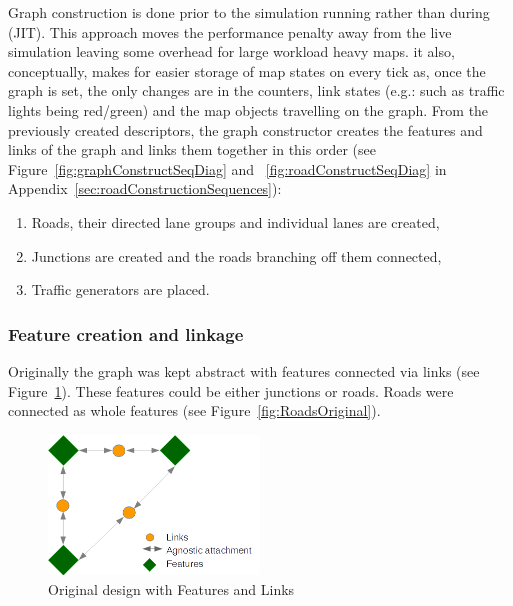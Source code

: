 Graph construction is done prior to the simulation running rather than during (JIT). This approach moves the performance penalty away from the live simulation leaving some overhead for large workload heavy maps. it also, conceptually, makes for easier storage of map states on every tick as, once the graph is set, the only changes are in the counters, link states (e.g.: such as traffic lights being red/green) and the map objects travelling on the graph.
From the previously created descriptors, the graph constructor creates the features and links of the graph and links them together in this order (see Figure~\ref{fig:graphConstructSeqDiag} and ~\ref{fig:roadConstructSeqDiag} in Appendix~\ref{sec:roadConstructionSequences}):
\begin{enumerate}
	\item Roads, their directed lane groups and individual lanes are created,
	\item Junctions are created and the roads branching off them connected,
	\item Traffic generators are placed.
\end{enumerate}

\subsubsection{Feature creation and linkage}

Originally the graph was kept abstract with features connected via links (see Figure~\ref{fig:FeatureConnect}). These features could be either junctions or roads. Roads were connected as whole features (see Figure~\ref{fig:RoadsOriginal}).

\begin{figure}[h]
	\vspace{1.5em}
    \caption{Original design with Features and Links}
    \label{fig:FeatureConnect}
    \centering
    \includegraphics[width=0.50\textwidth]{figs/graphConstruction/OriginalConnections.png}
    \vspace{1.5em}
\end{figure}

